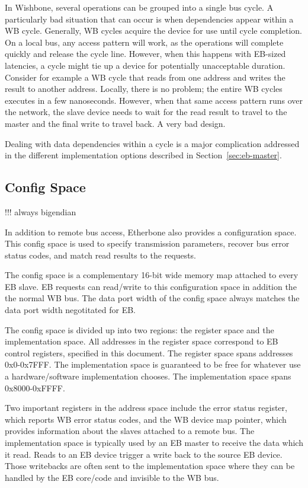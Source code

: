 \documentclass{article}
\begin{document}
In Wishbone, several operations can be grouped into a single bus cycle.
A particularly bad situation that can occur is when dependencies appear within a WB cycle.
Generally, WB cycles acquire the device for use until cycle completion.
On a local bus, any access pattern will work, 
as the operations will complete quickly and release the cycle line.
However, when this happens with EB-sized latencies, 
a cycle might tie up a device for potentially unacceptable duration.
Consider for example a WB cycle that reads from one address 
and writes the result to another address.
Locally, there is no problem; the entire WB cycles executes in a few
nanoseconds.
However, when that same access pattern runs over the network,
the slave device needs to wait for the read result to travel to the master and the final write to travel back.
A very bad design.

Dealing with data dependencies within a cycle is a major complication
addressed in the different implementation options described in
Section~\ref{sec:eb-master}.

\subsection{Config Space}

!!! always bigendian

In addition to remote bus access, 
Etherbone also provides a configuration space.
This config space is used to specify transmission parameters,
recover bus error status codes,
and match read results to the requests.

The config space is a complementary 16-bit wide memory map attached to every EB slave.
EB requests can read/write to this configuration space in addition the the normal WB bus.
The data port width of the config space always matches the data port width negotitated for EB.

The config space is divided up into two regions: the register space and the implementation space.
All addresses in the register space correspond to EB control registers,
specified in this document.
The register space spans addresses 0x0-0x7FFF.
The implementation space is guaranteed to be free for whatever use
a hardware/software implementation chooses.
The implementation space spans 0x8000-0xFFFF.

Two important registers in the address space include the error status
register, which reports WB error status codes, and the WB device map pointer,
which provides information about the slaves attached to a remote bus.
The implementation space is typically used by an EB master to receive
the data which it read.
Reads to an EB device trigger a write back to the source EB device.
Those writebacks are often sent to the implementation space 
where they can be handled by the EB core/code and invisible to the WB bus.
\end{document}
